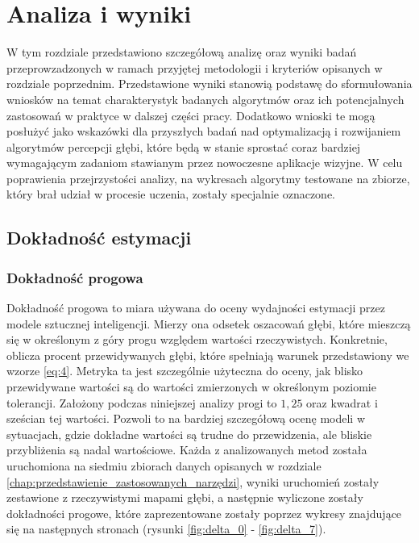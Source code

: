 \chapter{Analiza i wyniki}\label{chap:analiza_i_wyniki}

W tym rozdziale przedstawiono szczegółową analizę oraz wyniki badań przeprowzadzonych w ramach przyjętej metodologii i kryteriów opisanych w rozdziale poprzednim. Przedstawione wyniki stanowią podstawę do sformułowania wniosków na temat charakterystyk badanych algorytmów oraz ich potencjalnych zastosowań w praktyce w dalszej części pracy. Dodatkowo wnioski te mogą posłużyć jako wskazówki dla przyszłych badań nad optymalizacją i rozwijaniem algorytmów percepcji głębi, które będą w stanie sprostać coraz bardziej wymagającym zadaniom stawianym przez nowoczesne aplikacje wizyjne. W celu poprawienia przejrzystości analizy, na wykresach algorytmy testowane na zbiorze, który brał udział w procesie uczenia, zostały specjalnie oznaczone.

\section{Dokładność estymacji}
\subsection{Dokładność progowa}
Dokładność progowa to miara używana do oceny wydajności estymacji przez modele sztucznej inteligencji. Mierzy ona odsetek oszacowań głębi, które mieszczą się w określonym z góry progu względem wartości rzeczywistych. Konkretnie, oblicza procent przewidywanych głębi, które spełniają warunek przedstawiony we wzorze \ref{eq:4}. Metryka ta jest szczególnie użyteczna do oceny, jak blisko przewidywane wartości są do wartości zmierzonych w określonym poziomie tolerancji. Założony podczas niniejszej analizy progi to $1,25$ oraz kwadrat i sześcian tej wartości. Pozwoli to na bardziej szczegółową ocenę modeli w sytuacjach, gdzie dokładne wartości są trudne do przewidzenia, ale bliskie przybliżenia są nadal wartościowe. Każda z analizowanych metod została uruchomiona na siedmiu zbiorach danych opisanych w rozdziale \ref{chap:przedstawienie_zastosowanych_narzędzi}, wyniki uruchomień zostały zestawione z rzeczywistymi mapami głębi, a następnie wyliczone zostały dokładności progowe, które zaprezentowane zostały poprzez wykresy znajdujące się na następnych stronach (rysunki \ref{fig:delta_0} - \ref{fig:delta_7}).

